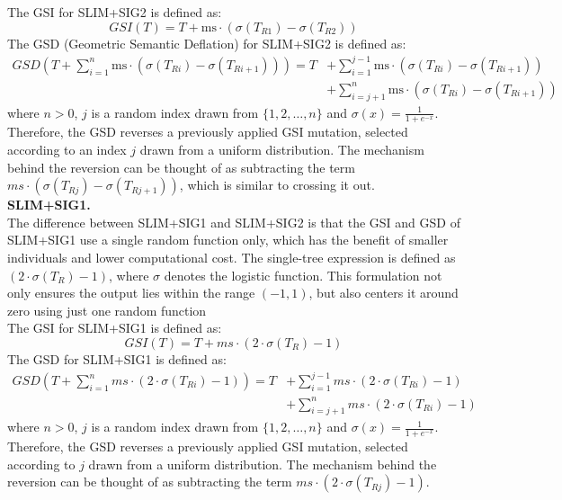 \documentclass[manuscript, review, anonymous]{acmart} %
\begin{document}
The GSI for SLIM+SIG2 is defined as:
\[
GSI(T) = T + \text{ms} \cdot \left( \sigma(T_{R1}) - \sigma(T_{R2}) \right)
\]
The GSD (Geometric Semantic Deflation) for SLIM+SIG2 is defined as:
\begin{align*}
GSD\left(T + \sum_{i=1}^{n} \text{ms} \cdot \left( \sigma(T_{Ri}) - \sigma(T_{Ri+1}) \right)\right)
= T &+ \sum_{i=1}^{j-1} \text{ms} \cdot \left( \sigma(T_{Ri}) - \sigma(T_{Ri+1}) \right) \\
    &+ \sum_{i=j+1}^{n} \text{ms} \cdot \left( \sigma(T_{Ri}) - \sigma(T_{Ri+1}) \right)
\end{align*}
where \( n > 0 \), \( j \) is a random index drawn from \( \{1, 2, \dots, n\} \) and \( \sigma(x) = \frac{1}{1 + e^{-x}} \).\\
Therefore, the GSD reverses a previously applied GSI mutation, selected
according to an index \( j \) drawn from a
uniform distribution.
The mechanism behind the reversion can be thought of as subtracting the term $ms \cdot (\sigma(T_{Rj}) - \sigma(T_{Rj+1}))$, which is similar to crossing it out.\\
\textbf{SLIM+SIG1.}\\
The difference between SLIM+SIG1 and SLIM+SIG2 is that the GSI and GSD of 
SLIM+SIG1 use a single random function only, 
which has the benefit of smaller individuals and lower computational cost. 
The single-tree expression is defined as \((2 \cdot \sigma(T_R) - 1)\), where \(\sigma\) denotes the logistic function. 
This formulation not only ensures the output lies within the range \((-1, 1)\), but also centers it around zero using just one random function\\
The GSI for SLIM+SIG1 is defined as:
\[
GSI(T) = T + ms \cdot \left(2 \cdot \sigma(T_R) - 1\right)
\]
The GSD for SLIM+SIG1 is defined as:
\begin{align*}
GSD\left(T + \sum_{i=1}^{n} ms \cdot \left(2 \cdot \sigma(T_{Ri}) - 1\right)\right)
= T &+ \sum_{i=1}^{j-1} ms \cdot \left(2 \cdot \sigma(T_{Ri}) - 1\right) \\
    &+ \sum_{i=j+1}^{n} ms \cdot \left(2 \cdot \sigma(T_{Ri}) - 1\right)
\end{align*}
where \( n > 0 \), \( j \) is a random index drawn from \( \{1, 2, \dots, n\} \) and \( \sigma(x) = \frac{1}{1 + e^{-x}} \).\\
Therefore, the GSD reverses a previously applied GSI mutation, selected
according to \( j \) drawn from a uniform distribution.
The mechanism behind the reversion can be thought of as subtracting the term $ms \cdot \left(2 \cdot \sigma(T_{Rj}) - 1\right)$.\\
\end{document}
